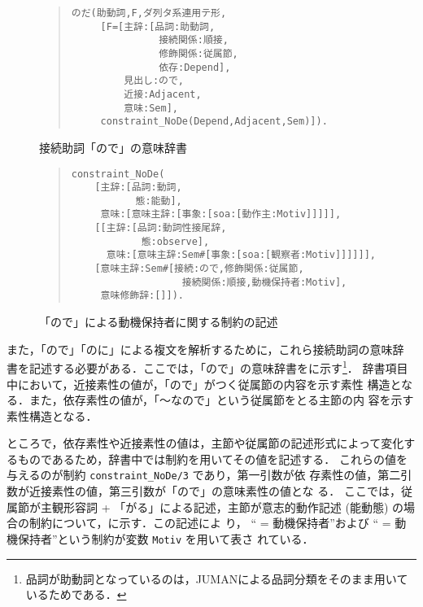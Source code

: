 \begin{figure}[htbp]
\begin{quote}
\setlength{\baselineskip}{4.2mm}
\begin{verbatim}
のだ(助動詞,F,ダ列タ系連用テ形,
     [F=[主辞:[品詞:助動詞,
               接続関係:順接,
               修飾関係:従属節,
               依存:Depend],
         見出し:ので,
         近接:Adjacent,
         意味:Sem],
     constraint_NoDe(Depend,Adjacent,Sem)]).
\end{verbatim}
\end{quote}

\caption{接続助詞「ので」の意味辞書}
\end{figure}

\begin{figure}[htbp]
\begin{quote}
\setlength{\baselineskip}{4.2mm}
\begin{verbatim}
constraint_NoDe(
    [主辞:[品詞:動詞,
           態:能動],
     意味:[意味主辞:[事象:[soa:[動作主:Motiv]]]]],
    [[主辞:[品詞:動詞性接尾辞,
            態:observe],
      意味:[意味主辞:Sem#[事象:[soa:[観察者:Motiv]]]]]],
    [意味主辞:Sem#[接続:ので,修飾関係:従属節,
                   接続関係:順接,動機保持者:Motiv],
     意味修飾辞:[]]).
\end{verbatim}
\end{quote}

\caption{「ので」による動機保持者に関する制約の記述}
\end{figure}

また，「ので」「のに」による複文を解析するために，これら接続助詞の意味辞
書を記述する必要がある．ここでは，「ので」の意味辞書をに示す\footnote{品詞が助動詞となっているのは，JUMAN\cite{松本:
NewJUMANmanual}による品詞分類をそのまま用いているためである．}．
辞書項目中において，近接素性の値が，「ので」がつく従属節の内容を示す素性
構造となる．また，依存素性の値が，「〜なので」という従属節をとる主節の内
容を示す素性構造となる．

ところで，依存素性や近接素性の値は，主節や従属節の記述形式によって変化す
るものであるため，辞書中では制約を用いてその値を記述する．
これらの値を与えるのが制約 {\tt constraint\_NoDe/3} であり，第一引数が依
存素性の値，第二引数が近接素性の値，第三引数が「ので」の意味素性の値とな
る．
ここでは，従属節が主観形容詞 + 「がる」による記述，主節が意志的動作記述 
(能動態) の場合の制約について，に示す．この記述によ
り， `` = 動機保持者''および `` = 動機保持者''という制約が変数 {\tt Motiv} を用いて表さ
れている．

